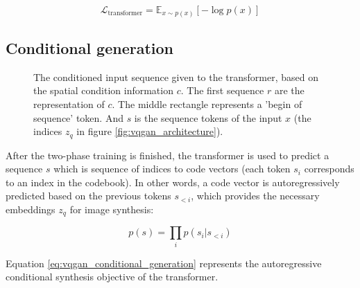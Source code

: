 \begin{equation*}
    \mathcal{L}_{\text{transformer}} = \mathbb{E}_{x \sim p(x)} [- \log p(x)]
\end{equation*}









\subsection{Conditional generation}

\begin{figure}
    \centering
    \caption{The conditioned input sequence given to the transformer, based on the spatial condition information $c$. The first sequence $r$ are the representation of $c$. The middle rectangle represents a 'begin of sequence' token. And $s$ is the sequence tokens of the input $x$ (the indices $z_q$ in figure \ref{fig:vqgan_architecture}).}
    \label{fig:vqgan_conditional_generation}
\end{figure}


After the two-phase training is finished, the transformer is used to predict a sequence $s$ which is sequence of indices to code vectors (each token $s_i$ corresponds to an index in the codebook). In other words, a code vector is autoregressively predicted based on the previous tokens $s_{<i}$, which provides the necessary embeddings $z_q$ for image synthesis: 

\begin{equation}
    p(s) = \prod_{i} p(s_i | s_{<i})
    \label{eq:vqgan_conditional_generation}
\end{equation}

Equation \ref{eq:vqgan_conditional_generation} represents the autoregressive conditional synthesis objective of the transformer.


